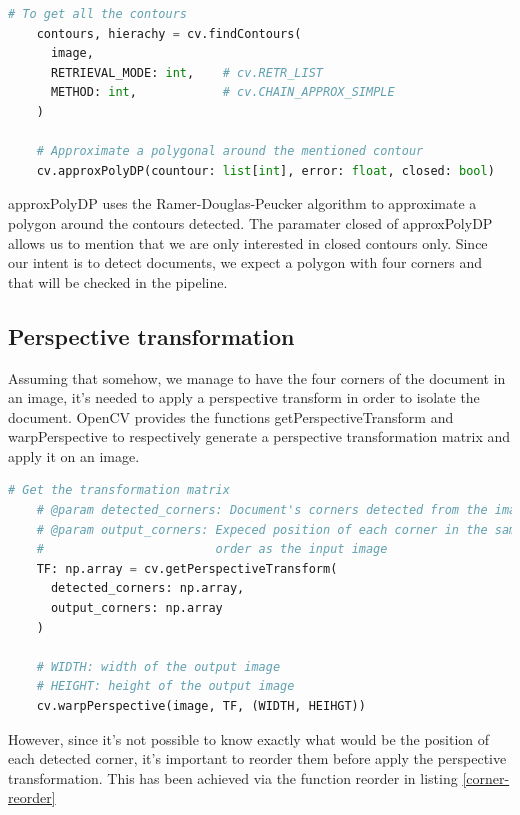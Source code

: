 \documentclass{scrartcl}
\newcommand{\param}[1]{{\ttfamily\footnotesize{#1}}}
\begin{document}
  \begin{lstlisting}[language=Python, caption={Contour detection}, label={cv-canny-edge}]
    # To get all the contours
    contours, hierachy = cv.findContours(
      image,
      RETRIEVAL_MODE: int,    # cv.RETR_LIST
      METHOD: int,            # cv.CHAIN_APPROX_SIMPLE
    )

    # Approximate a polygonal around the mentioned contour 
    cv.approxPolyDP(countour: list[int], error: float, closed: bool)
  \end{lstlisting}

  \param{approxPolyDP} uses the Ramer-Douglas-Peucker algorithm \cite{cv-approx-polydp}
  to approximate a polygon around the contours detected. The paramater \param{closed} of
  \param{approxPolyDP} allows us to mention that we are only interested in closed contours
  only. Since our intent is to detect documents, we expect a polygon with four corners
  and that will be checked in the pipeline.

  \subsection{Perspective transformation}

  Assuming that somehow, we manage to have the four corners of the document in an image, it's needed to
  apply a perspective transform in order to isolate the document. OpenCV provides the functions
  \param{getPerspectiveTransform} and \param{warpPerspective} to respectively generate a perspective
  transformation matrix and apply it on an image.

  \begin{lstlisting}[language=Python, caption={Perspective transformation}, label={cv-perspective-transform}]
    # Get the transformation matrix
    # @param detected_corners: Document's corners detected from the image
    # @param output_corners: Expeced position of each corner in the same
    #                        order as the input image
    TF: np.array = cv.getPerspectiveTransform(
      detected_corners: np.array,
      output_corners: np.array
    )
    
    # WIDTH: width of the output image
    # HEIGHT: height of the output image
    cv.warpPerspective(image, TF, (WIDTH, HEIHGT))
  \end{lstlisting}

  However, since it's not possible to know exactly what would be the position of each detected corner,
  it's important to reorder them before apply the perspective transformation. This has been achieved
  via the function \param{reorder} in listing \ref{corner-reorder}
\end{document}
